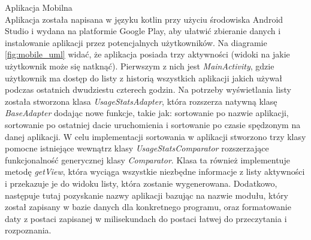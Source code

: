 \documentclass[a4paper,twoside,12pt]{book}
\begin{document}
\begin{description}
\item Aplikacja Mobilna  \hfill \\
Aplikacja została napisana w języku kotlin przy użyciu środowiska Android Studio i wydana na platformie Google Play, aby ułatwić zbieranie danych i instalowanie aplikacji przez potencjalnych użytkowników.
Na diagramie \ref{fig:mobile_uml} widać, że aplikacja posiada trzy aktywności (widoki na jakie użytkownik może się natknąć). Pierwszym z nich jest \textit{MainActivity}, gdzie użytkownik ma dostęp do listy z historią wszystkich aplikacji jakich używał podczas ostatnich dwudziestu czterech godzin. Na potrzeby wyświetlania listy została stworzona klasa \textit{UsageStatsAdapter}, która rozszerza natywną klasę \textit{BaseAdapter} dodając nowe funkcje, takie jak: sortowanie po nazwie aplikacji, sortowanie po ostatniej dacie uruchomienia i sortowanie po czasie spędzonym na danej aplikacji. W celu implementacji sortowania w aplikacji stworzono trzy klasy pomocne istniejące wewnątrz klasy \textit{UsageStatsComparator} rozszerzające funkcjonalność generycznej klasy \textit{Comparator}. Klasa ta również implementuje metodę \textit{getView}, która wyciąga wszystkie niezbędne informacje z listy aktywności i przekazuje je do widoku listy, która zostanie wygenerowana. Dodatkowo, następuje tutaj pozyskanie nazwy aplikacji bazując na nazwie modułu, który został zapisany w bazie danych dla konkretnego programu, oraz formatowanie daty z postaci zapisanej w milisekundach do postaci łatwej do przeczytania i rozpoznania. 

\end{description}
\end{document}
